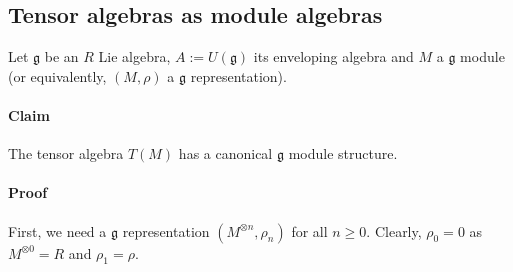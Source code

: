 \documentclass[10pt,a4paper]{article}
\newcommand{\lie}{\mathfrak{g}}
\begin{document}
\subsection{Tensor algebras as module algebras}
Let $\lie$ be an $R$ Lie algebra, $A := U(\lie)$ its enveloping algebra and $M$ a $\lie$ module (or equivalently, $(M, \rho)$ a $\lie$ representation).
\paragraph{Claim} The tensor algebra $T(M)$ has a canonical $\lie$ module structure.
\paragraph{Proof} First, we need a $\lie$ representation $(M^{\otimes n}, \rho_n)$ for all $n \geq 0$.
Clearly, $\rho_0 = 0$ as $M^{\otimes 0} = R$ and $\rho_1 = \rho$.
\end{document}
